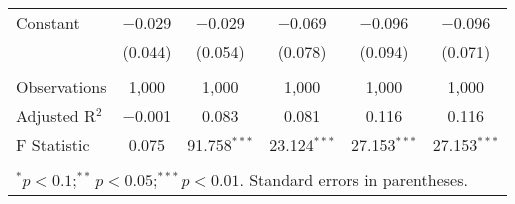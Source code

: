 \documentclass[11pt, a4paper]{article}\usepackage[]{graphicx}\usepackage[]{color}
\begin{document}
\begin{table}[!htbp]
\begin{tabular}{@{\extracolsep{5pt}}lccccc}
  Constant & $-$0.029 & $-$0.029 & $-$0.069 & $-$0.096 & $-$0.096 \\ 
  & (0.044) & (0.054) & (0.078) & (0.094) & (0.071) \\ 
 \hline \\[-1.8ex] 
Observations & 1,000 & 1,000 & 1,000 & 1,000 & 1,000 \\ 
Adjusted R$^{2}$ & $-$0.001 & 0.083 & 0.081 & 0.116 & 0.116 \\ 
F Statistic & 0.075 & 91.758$^{***}$ & 23.124$^{***}$ & 27.153$^{***}$ & 27.153$^{***}$ \\ 
\hline 
\hline \\[-1.8ex] 
\multicolumn{6}{l}{\parbox[t]{10cm}{$^{*}p<0.1;^{**}p<0.05;^{***}p<0.01$. Standard errors in parentheses.}} \\ 
\end{tabular} 
\end{table} 
\end{document}
